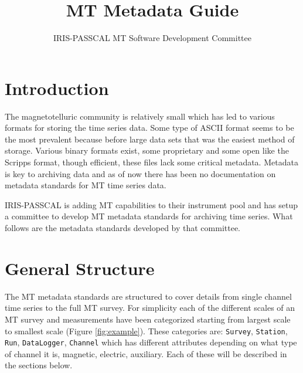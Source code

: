 \documentclass{article}
\title{MT Metadata Guide}
\author[1]{IRIS-PASSCAL MT Software Development Committee}
\affil[1]{IRIS}
\begin{document}
	
\maketitle

\tableofcontents

\newpage

\section{Introduction}

The magnetotelluric community is relatively small which has led to various formats for storing the time series data.  Some type of ASCII format seems to be the most prevalent because before large data sets that was the easiest method of storage. Various binary formats exist, some proprietary and some open like the Scripps format, though efficient, these files lack some critical metadata.  Metadata is key to archiving data and as of now there has been no documentation on metadata standards for MT time series data.  

IRIS-PASSCAL is adding MT capabilities to their instrument pool and has setup a committee to develop MT metadata standards for archiving time series.  What follows are the metadata standards developed by that committee.


\section{General Structure}

The MT metadata standards are structured to cover details from single channel time series to the full MT survey.  For simplicity each of the different scales of an MT survey and measurements have been categorized starting from largest scale to smallest scale (Figure \ref{fig:example}).  These categories are: \verb|Survey|, \verb|Station|, \verb|Run|, \verb|DataLogger|, \verb|Channel| which has different attributes depending on what type of channel it is, magnetic, electric, auxiliary.  Each of these will be described in the sections below.  
\end{document}
